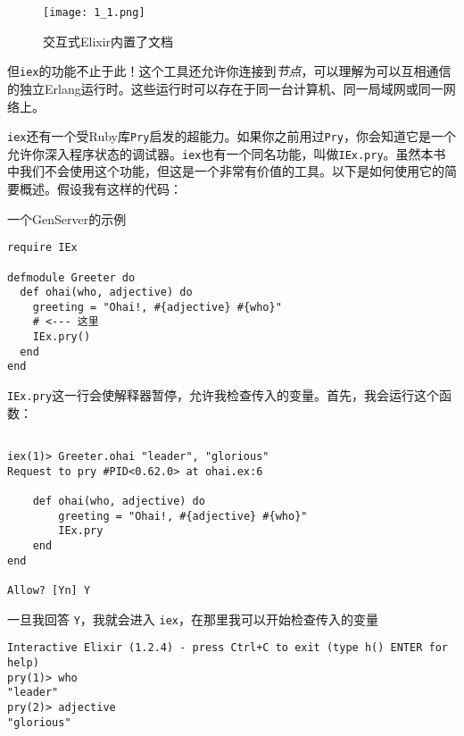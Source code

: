 \begin{figure}[htbp]
  \centering
  \texttt{[image: 1\_1.png]}
  \caption{交互式Elixir内置了文档}
  \label{fig:1_1}
\end{figure}


但\texttt{iex}的功能不止于此！这个工具还允许你连接到\emph{节点}，可以理解为可以互相通信的独立Erlang运行时。这些运行时可以存在于同一台计算机、同一局域网或同一网络上。

\texttt{iex}还有一个受Ruby库\texttt{Pry}启发的超能力。如果你之前用过\texttt{Pry}，你会知道它是一个允许你深入程序状态的调试器。\texttt{iex}也有一个同名功能，叫做\texttt{IEx.pry}。虽然本书中我们不会使用这个功能，但这是一个非常有价值的工具。以下是如何使用它的简要概述。假设我有这样的代码：

\begin{code}{一个GenServer的示例}
\begin{verbatim}
require IEx

defmodule Greeter do
  def ohai(who, adjective) do
    greeting = "Ohai!, #{adjective} #{who}"
    # <--- 这里
    IEx.pry()
  end
end
\end{verbatim}
\label{lst:genserver_example}
\end{code}

\texttt{IEx.pry}这一行会使解释器暂停，允许我检查传入的变量。首先，我会运行这个函数：

\begin{code}{}\begin{verbatim}

iex(1)> Greeter.ohai "leader", "glorious"
Request to pry #PID<0.62.0> at ohai.ex:6

    def ohai(who, adjective) do
        greeting = "Ohai!, #{adjective} #{who}"
        IEx.pry
    end
end

Allow? [Yn] Y
\end{verbatim}
\end{code}

一旦我回答 \texttt{Y}，我就会进入 \texttt{iex}，在那里我可以开始检查传入的变量

\begin{code}{}\begin{verbatim}
Interactive Elixir (1.2.4) - press Ctrl+C to exit (type h() ENTER for help)
pry(1)> who
"leader"
pry(2)> adjective
"glorious"
\end{verbatim}
\end{code}

